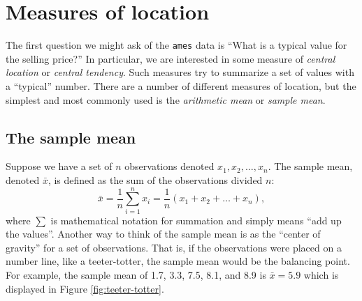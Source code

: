 \documentclass[]{book}
\newenvironment{Shaded}{\begin{snugshade}}{\end{snugshade}}
\newcommand{\CommentTok}[1]{\textcolor[rgb]{0.56,0.35,0.01}{\textit{#1}}}
\newcommand{\DataTypeTok}[1]{\textcolor[rgb]{0.13,0.29,0.53}{#1}}
\newcommand{\KeywordTok}[1]{\textcolor[rgb]{0.13,0.29,0.53}{\textbf{#1}}}
\newcommand{\NormalTok}[1]{#1}
\newcommand{\OperatorTok}[1]{\textcolor[rgb]{0.81,0.36,0.00}{\textbf{#1}}}
\newcommand{\StringTok}[1]{\textcolor[rgb]{0.31,0.60,0.02}{#1}}
\theoremstyle{definition}
\theoremstyle{definition}
\theoremstyle{definition}
\theoremstyle{remark}
\begin{document}
\begin{Shaded}
\end{Shaded}

\hypertarget{measures-of-location}{%
\section{Measures of location}\label{measures-of-location}}

The first question we might ask of the \texttt{ames} data is ``What is a
typical value for the selling price?'' In particular, we are interested
in some measure of \emph{central location} or \emph{central tendency}.
Such measures try to summarize a set of values with a ``typical''
number. There are a number of different measures of location, but the
simplest and most commonly used is the \emph{arithmetic mean} or
\emph{sample mean}.

\hypertarget{the-sample-mean}{%
\subsection{The sample mean}\label{the-sample-mean}}

Suppose we have a set of \(n\) observations denoted
\(x_1, x_2, \dots, x_n\). The sample mean, denoted \(\bar{x}\), is
defined as the sum of the observations divided \(n\): \begin{equation}
\label{eqn:sample-mean}
  \bar{x} = \frac{1}{n}\sum_{i = 1}^n x_i = \frac{1}{n}\left(x_1 + x_2 + \dots + x_n\right),
\end{equation} where \(\sum\) is mathematical notation for summation and
simply means ``add up the values''. Another way to think of the sample
mean is as the ``center of gravity'' for a set of observations. That is,
if the observations were placed on a number line, like a teeter-totter,
the sample mean would be the balancing point. For example, the sample
mean of 1.7, 3.3, 7.5, 8.1, and 8.9 is \(\bar{x} = 5.9\) which is
displayed in Figure \ref{fig:teeter-totter}.
\end{document}
